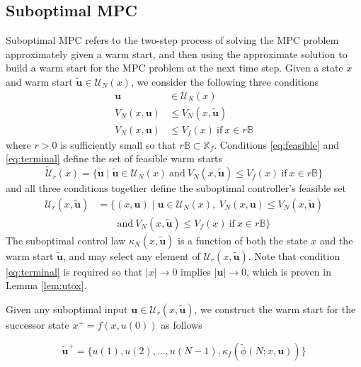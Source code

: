 \documentclass{article}
\newcommand{\abs}[1]{\left\lvert #1 \right\rvert}
\begin{document}
\subsection{Suboptimal MPC}
Suboptimal MPC refers to the two-step process of solving the MPC problem
approximately given a warm start, and then using the approximate solution to build a warm start 
for the MPC problem at the next time step. Given a state $x$ and warm start 
$\tilde{\mathbf{u}} \in \mathcal{U}_N(x)$, we consider the following three conditions
\begin{align}
\label{eq:feasible}
\mathbf{u} &\in \mathcal{U}_N(x) \\
\label{eq:improved}
V_N(x,\mathbf{u}) &\leq V_N(x,\tilde{\mathbf{u}})  \\
\label{eq:terminal}
V_N(x,\mathbf{u}) &\leq V_f(x) \ \text{if} \ x \in r\mathbb{B}
\end{align}
where $r>0$ is sufficiently small so that $r\mathbb{B} \subset \mathbb{X}_f$. Conditions 
\eqref{eq:feasible} and \eqref{eq:terminal} define the set of feasible warm starts
\begin{equation}
\label{eq:feaswarm}
\tilde{\mathcal{U}}_r(x) = \{ \tilde{\mathbf{u}} \mid \tilde{\mathbf{u}} \in \mathcal{U}_N(x) \ 
\text{and} \ V_N(x,\tilde{\mathbf{u}}) \leq V_f(x) \ \text{if} \ x \in r\mathbb{B} \}
\end{equation}
and all three conditions together define the suboptimal controller's feasible set
\begin{align}
\label{eq:subcontrol}
\mathcal{U}_r(x,\tilde{\mathbf{u}}) &= \{ (x,\mathbf{u}) \mid \mathbf{u} \in \mathcal{U}_N(x), \
V_N(x,\mathbf{u}) \leq V_N(x,\tilde{\mathbf{u}}) \nonumber \\
&\qquad \text{and} \ V_N(x,\tilde{\mathbf{u}}) \leq V_f(x) \ \text{if} \ x \in r\mathbb{B} \}
\end{align}
The
suboptimal control law $\kappa_N(x,\tilde{\mathbf{u}})$ is a function of both the state $x$ and the
warm start $\tilde{\mathbf{u}}$, and may select any element of $\mathcal{U}_r(x,\tilde{\mathbf{u}})$.
Note that condition \eqref{eq:terminal} is required so that $\abs{x} \rightarrow 0$ implies 
$\abs{\mathbf{u}} \rightarrow 0$, which is proven in Lemma \ref{lem:utox}.

Given any suboptimal input $\mathbf{u} \in \mathcal{U}_r(x,\tilde{\mathbf{u}})$,
we construct the warm start for the successor state $x^+=f(x,u(0))$ as follows

\begin{equation}
\label{eq:warm}
\tilde{\mathbf{u}}^+ =
\{u(1),u(2),\dots,u(N-1),\kappa_f(\tilde{\phi}(N;x,\mathbf{u}))\} 
\end{equation}
\end{document}
